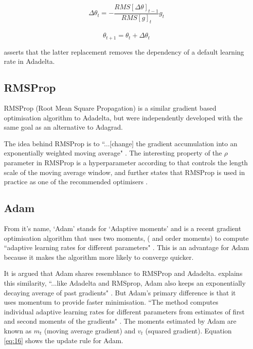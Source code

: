\documentclass[report, 11pt, oneside]{dissertation}
\begin{document}
\begin{equation} \label{eq:14}
	\Delta \theta_t = - \frac{RMS[\Delta \theta]_{t-1}}{RMS[g]_{t}} g_{t}
\end{equation}
\
\begin{equation} \label{eq:15}
	\theta_{t+1} = \theta_t + \Delta \theta_t
\end{equation}

\citeauthor{Ruder:2016tr} asserts that the latter replacement removes the dependency of a default learning rate in Adadelta. \citeyearpar[6]{Ruder:2016tr}

\subsection{RMSProp}

RMSProp (Root Mean Square Propagation) is a similar gradient based optimisation algorithm to Adadelta, but were independently developed with the same goal as an alternative to Adagrad. 

The idea behind RMSProp is to ``...[change] the gradient accumulation into an exponentially weighted moving average" \citep[299]{Goodfellow-et-al-2016}. The interesting property of the $\rho$ parameter in RMSProp is a hyperparameter according to \citeauthor{Goodfellow-et-al-2016} that controls the length scale of the moving average window, and further states that RMSProp is used in practice as one of the recommended optimisers \citeyearpar[301]{Goodfellow-et-al-2016}.

\subsection{Adam}

From it's name, `Adam' stands for `Adaptive moments' and is a recent gradient optimisation algorithm that uses two moments, ( and  order moments) to compute ``adaptive learning rates for different parameters" \citep[1]{Kingma:2014us}. This is an advantage for Adam because it makes the algorithm more likely to converge quicker.

It is argued that Adam shares resemblance to RMSProp and Adadelta. \citep{Ruder:2016tr} explains this similarity, ``...like Adadelta and RMSprop, Adam also keeps an exponentially decaying average of past gradients" \citep[7]{Ruder:2016tr}. But Adam's primary difference is that it uses momentum to provide faster minimisation.  ``The method computes individual adaptive learning rates for different parameters from estimates of first and second moments of the gradients" \citep[1]{Kingma:2014us}. The moments estimated by Adam are known as $m_t$ (moving average gradient) and $v_t$ (squared gradient). Equation \ref{eq:16} shows the update rule for Adam.
\end{document}
